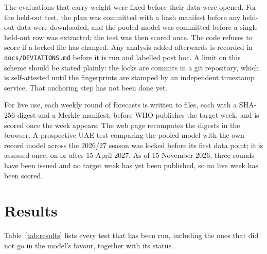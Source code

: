 \documentclass[11pt,a4paper]{article}
\begin{document}
The evaluations that carry weight were fixed before their data were opened. For the held-out test, the plan was committed with a hash manifest before any held-out data were downloaded, and the pooled model was committed before a single held-out row was extracted; the test was then scored once. The code refuses to score if a locked file has changed. Any analysis added afterwards is recorded in \texttt{docs/DEVIATIONS.md} before it is run and labelled post hoc. A limit on this scheme should be stated plainly: the locks are commits in a git repository, which is self-attested until the fingerprints are stamped by an independent timestamp service. That anchoring step has not been done yet.

For live use, each weekly round of forecasts is written to files, each with a SHA-256 digest and a Merkle manifest, before WHO publishes the target week, and is scored once the week appears. The web page recomputes the digests in the browser. A prospective UAE test comparing the pooled model with the own-record model across the 2026/27 season was locked before its first data point; it is assessed once, on or after 15 April 2027. As of 15 November 2026, three rounds have been issued and no target week has yet been published, so no live week has been scored.

\section{Results}

Table~\ref{tab:results} lists every test that has been run, including the ones that did not go in the model's favour, together with its status.
\end{document}

